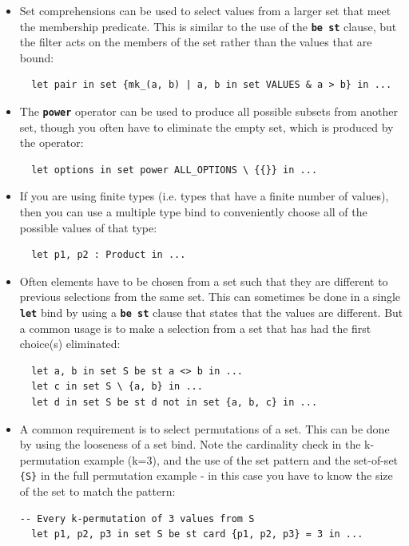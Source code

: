 \documentclass{overturerepchap}
\begin{document}
\begin{itemize}
  \item Set comprehensions can be used to select values from a larger set that
  meet the membership predicate. This is similar to the use of the \texttt{\textbf{be
  st}} clause, but the filter acts on the members of the set rather than the
  values that are bound:
\small
\begin{lstlisting}
  let pair in set {mk_(a, b) | a, b in set VALUES & a > b} in ...
\end{lstlisting}
\normalsize
  \item The \texttt{\textbf{power}} operator can be used to produce all possible
  subsets from another set, though you often have to eliminate the empty set, which is
  produced by the operator:
\small
\begin{lstlisting}
  let options in set power ALL_OPTIONS \ {{}} in ...
\end{lstlisting}
\normalsize
  \item If you are using finite types (i.e. types that have a finite number of
  values), then you can use a multiple type bind to conveniently choose all of
  the possible values of that type:
\small
\begin{lstlisting}
  let p1, p2 : Product in ...
\end{lstlisting}
\normalsize
  \item Often elements have to be chosen from a set such that they are different
  to previous selections from the same set. This can sometimes be done in a
  single \texttt{\textbf{let}} bind by using a \texttt{\textbf{be st}} clause that states that the
  values are different. But a common usage is to make a selection from a set
  that has had the first choice(s) eliminated:
\small
\begin{lstlisting}
  let a, b in set S be st a <> b in ...
  let c in set S \ {a, b} in ...
  let d in set S be st d not in set {a, b, c} in ...
\end{lstlisting}
\normalsize
  \item A common requirement is to select permutations of a set. This can be
  done by using the looseness of a set bind. Note the cardinality check in the
  k-permutation example (k=3), and the use of the set pattern and the
  set-of-set \texttt{\{S\}} in the full permutation example - in this case you
  have to know the size of the set to match the pattern:
\small
\begin{lstlisting}
-- Every k-permutation of 3 values from S
  let p1, p2, p3 in set S be st card {p1, p2, p3} = 3 in ...

\end{lstlisting}
\end{itemize}
\end{document}
